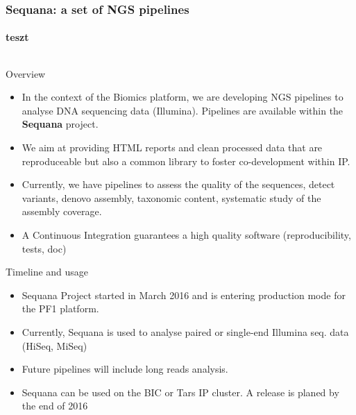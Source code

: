 \documentclass{beamer}
\begin{document}
\begin{frame}
 \frametitle{Sequana: a set of NGS pipelines}
 \framesubtitle{teszt}
 \begin{columns}
 \begin{column}{0.48\textwidth}
\tiny 
\begin{block}{Overview}
\begin{itemize}
 \item  In the context of the Biomics platform, we are developing NGS pipelines 
 to analyse DNA sequencing data (Illumina). Pipelines are 
available within the \textbf{Sequana} project.\\
\item  We aim at providing HTML reports and clean processed data that 
are reproduceable but also a common  library  to 
foster co-development within IP.\\
\item Currently, we have  pipelines to assess the quality of the sequences, 
detect variants, denovo assembly, taxonomic content, systematic 
study of the assembly coverage. \\
\item A Continuous Integration guarantees a high quality software (reproducibility, tests, doc)
\end{itemize}
\end{block}

 \begin{exampleblock}{\tiny Timeline and usage}
    \tiny
    \begin{itemize}
      \item Sequana Project started in March 2016 and is entering production mode for the PF1 platform.
      \item Currently, Sequana is used to analyse paired or single-end Illumina seq. data (HiSeq, MiSeq)
      \item Future pipelines will include long reads analysis.
      \item Sequana can be used on the BIC or Tars IP cluster. A release is planed by the end of 2016
      \end{itemize}
  \end{exampleblock}


\end{column}


\end{columns}
\end{frame}
\end{document}
